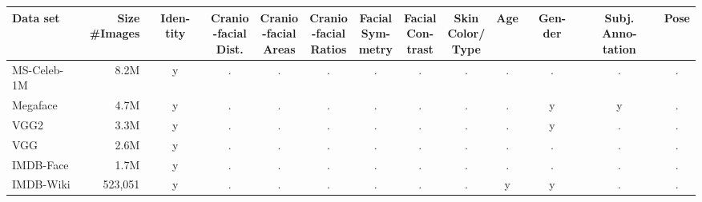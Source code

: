 \documentclass[letterpaper,11pt]{article}
\begin{document}
\begin{table}[!htbp]
\begin{center}
\begin{adjustbox}{angle=90}
\begin{small}
\begin{tabular}{|l|r|c|c|c|c|c|c|c|c|c|c|c|}\hline
 \rule{0pt}{37pt} {Data set} & \parbox[c]{0.5in}{Size\\\#Images} &  
  \parbox[m]{0.35in}{Iden-tity\\} & 
 \parbox[m]{0.45in}{Cranio\\-facial\\Dist.} & 
 \parbox[m]{0.45in}{Cranio\\-facial\\Areas} &
 \parbox[c]{0.45in}{Cranio\\-facial\\Ratios} &
\parbox[c]{0.45in}{Facial\\Sym-\\metry} & 
\parbox[c]{0.45in}{Facial\\Con-\\trast} & 
\parbox[c]{0.4in}{Skin\\Color/\\Type} & 
\parbox[c]{0.3in}{Age\\} & 
\parbox[c]{0.3in}{Gen-der\\} & 
\parbox[c]{0.45in}{Subj.\\Anno-tation\\} & 
\parbox[c]{0.45in}{Pose} \\ \hline \hline
MS-Celeb-1M \cite{MSCELEB1M_ECCV16}	& 8.2M & y & . & . & . & . & . & . & . & . & . & . \\ \hline
Megaface \cite{Megaface_CVPR16} &	4.7M   & y & . & . & . & . & . & . & . & y & y & . \\ \hline
VGG2 \cite{VGG2_FG18} & 3.3M              & y & . & . & . & . & . & . & . & y & . & . \\ \hline
VGG \cite{VGG_BMVC15} 	& 2.6M             & y & . & . & . & . & . & . & . & . & . & . \\ \hline
IMDB-Face \cite{imdbface_ECCV18} &	1.7M   & y & . & . & . & . & . & . & . & . & . & . \\ \hline
IMDB-Wiki \cite{age_image18} &523,051 & y & . & . & . & . & . & . & y & y & . & . \\ \hline

\end{tabular}
\end{small}
\end{adjustbox}
\end{center}
\end{table}
\end{document}
